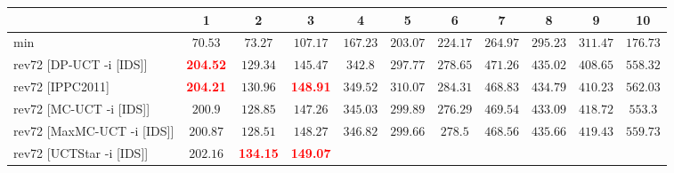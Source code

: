 \documentclass{article}
\begin{document}
\begin{tabular}{|l|r@{$\pm$}rr@{$\pm$}rr@{$\pm$}rr@{$\pm$}rr@{$\pm$}rr@{$\pm$}rr@{$\pm$}rr@{$\pm$}rr@{$\pm$}rr@{$\pm$}r|}
\hline

& \multicolumn{2}{c}{1}
& \multicolumn{2}{c}{2}
& \multicolumn{2}{c}{3}
& \multicolumn{2}{c}{4}
& \multicolumn{2}{c}{5}
& \multicolumn{2}{c}{6}
& \multicolumn{2}{c}{7}
& \multicolumn{2}{c}{8}
& \multicolumn{2}{c}{9}
& \multicolumn{2}{c|}{10}
\\
\hline
\hline
min
& \multicolumn{2}{c}{$70.53$}
& \multicolumn{2}{c}{$73.27$}
& \multicolumn{2}{c}{$107.17$}
& \multicolumn{2}{c}{$167.23$}
& \multicolumn{2}{c}{$203.07$}
& \multicolumn{2}{c}{$224.17$}
& \multicolumn{2}{c}{$264.97$}
& \multicolumn{2}{c}{$295.23$}
& \multicolumn{2}{c}{$311.47$}
& \multicolumn{2}{c|}{$176.73$}
\\
rev72 [DP-UCT -i [IDS]]
& \multicolumn{2}{c}{\textbf{\textcolor{red}{204.52}}}
& \multicolumn{2}{c}{$129.34$}
& \multicolumn{2}{c}{$145.47$}
& \multicolumn{2}{c}{$342.8$}
& \multicolumn{2}{c}{$297.77$}
& \multicolumn{2}{c}{$278.65$}
& \multicolumn{2}{c}{$471.26$}
& \multicolumn{2}{c}{$435.02$}
& \multicolumn{2}{c}{$408.65$}
& \multicolumn{2}{c|}{$558.32$}
\\
rev72 [IPPC2011]
& \multicolumn{2}{c}{\textbf{\textcolor{red}{204.21}}}
& \multicolumn{2}{c}{$130.96$}
& \multicolumn{2}{c}{\textbf{\textcolor{red}{148.91}}}
& \multicolumn{2}{c}{$349.52$}
& \multicolumn{2}{c}{$310.07$}
& \multicolumn{2}{c}{$284.31$}
& \multicolumn{2}{c}{$468.83$}
& \multicolumn{2}{c}{$434.79$}
& \multicolumn{2}{c}{$410.23$}
& \multicolumn{2}{c|}{$562.03$}
\\
rev72 [MC-UCT -i [IDS]]
& \multicolumn{2}{c}{$200.9$}
& \multicolumn{2}{c}{$128.85$}
& \multicolumn{2}{c}{$147.26$}
& \multicolumn{2}{c}{$345.03$}
& \multicolumn{2}{c}{$299.89$}
& \multicolumn{2}{c}{$276.29$}
& \multicolumn{2}{c}{$469.54$}
& \multicolumn{2}{c}{$433.09$}
& \multicolumn{2}{c}{$418.72$}
& \multicolumn{2}{c|}{$553.3$}
\\
rev72 [MaxMC-UCT -i [IDS]]
& \multicolumn{2}{c}{$200.87$}
& \multicolumn{2}{c}{$128.51$}
& \multicolumn{2}{c}{$148.27$}
& \multicolumn{2}{c}{$346.82$}
& \multicolumn{2}{c}{$299.66$}
& \multicolumn{2}{c}{$278.5$}
& \multicolumn{2}{c}{$468.56$}
& \multicolumn{2}{c}{$435.66$}
& \multicolumn{2}{c}{$419.43$}
& \multicolumn{2}{c|}{$559.73$}
\\
rev72 [UCTStar -i [IDS]]
& \multicolumn{2}{c}{$202.16$}
& \multicolumn{2}{c}{\textbf{\textcolor{red}{134.15}}}
& \multicolumn{2}{c}{\textbf{\textcolor{red}{149.07}}}

\end{tabular}
\end{document}

